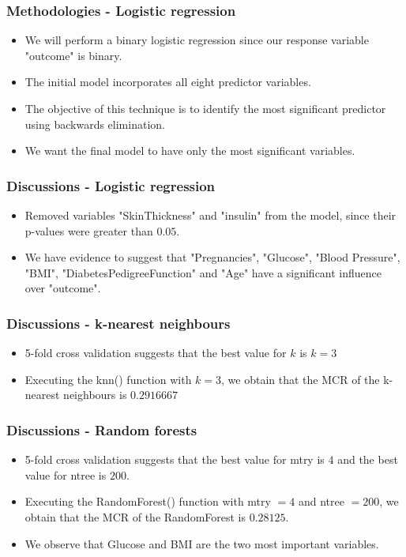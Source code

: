 \documentclass{beamer}
\begin{document}
\begin{frame}
    \frametitle{Methodologies - Logistic regression}
        \begin{itemize}
            \setlength\itemsep{1em}
            \item We will perform a binary logistic regression \cite{faraway2016extending} since our response variable "outcome" is binary.
            \item The initial model incorporates all eight predictor variables.
            \item The objective of this technique is to identify the most significant predictor using backwards elimination.
            \item We want the final model to have only the most significant variables.
        \end{itemize}
\end{frame}

\begin{frame}
    \frametitle{Discussions - Logistic regression}
        \begin{itemize}
            \setlength\itemsep{1em}
            \item Removed variables "SkinThickness" and "insulin" from the model, since their p-values were greater than $0.05$.
            \item We have evidence to suggest that "Pregnancies", "Glucose", "Blood Pressure", "BMI", "DiabetesPedigreeFunction" and "Age" have a significant influence over "outcome".
        \end{itemize}
\end{frame}

\begin{frame}
    \frametitle{Discussions - k-nearest neighbours}
        \begin{itemize}
            \setlength\itemsep{1em}
            \item 5-fold cross validation \cite{Lecture16} suggests that the best value for $k$ is $k=3$
            \item Executing the knn() \cite{Lecture16} function with $k=3$, we obtain that the MCR of the k-nearest neighbours is $0.2916667$
        \end{itemize}
\end{frame}

\begin{frame}
    \frametitle{Discussions - Random forests}
        \begin{itemize}
            \setlength\itemsep{1em}
            \item 5-fold cross validation \cite{Lecture16} suggests that the best value for mtry is $4$ and the best value for ntree is $200$.
            \item Executing the RandomForest() \cite{Lecture16} function with mtry $=4$ and ntree $=200$, we obtain that the MCR of the RandomForest is $0.28125$.
            \item We observe that Glucose and BMI are the two most important variables.
        \end{itemize}
\end{frame}
\end{document}
